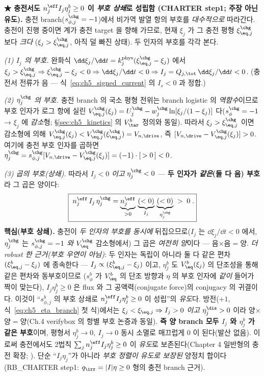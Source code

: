 \begin{verifybox}
\textbf{★ 충전서도 $n_j^{\eff}I_j\eta_j^b\ge0$ 이 \emph{부호 상쇄}로 성립함 (CHARTER step1; 주장 아닌 유도).}
충전 branch($s_{\phi,j}^\chg=-1$)에서 비가역 발열 항의 부호를 \emph{대수적으로} 따라간다. 충전이 진행 중이면
계가 충전 target 을 향해 가므로, 현재 $\xi_j$ 가 그 충전 평형 $\xi_{\eq,j}^\chg$ 보다 \emph{크다}
($\xi_j>\xi_{\eq,j}^\chg$, 아직 덜 빠진 상태). 두 인자의 부호를 각각 본다.

\emph{(1) $I_j$ 의 부호.} 완화식 $\dd\xi_j/\dd t=k_j^{\mathrm{phys}}(\xi_{\eq,j}^\chg-\xi_j)$ 에서
$\xi_j>\xi_{\eq,j}^\chg\Rightarrow\xi_{\eq,j}^\chg-\xi_j<0\Rightarrow\dd\xi_j/\dd t<0\Rightarrow I_j=Q_{j,\tot}
\,\dd\xi_j/\dd t<0$. (충전서 전류가 음 — 식~\eqref{eq:ch5_signed_current} 의 $I_s<0$ 과 정합.)

\emph{(2) $\eta_j^\chg$ 의 부호.} 충전 branch 의 국소 평형 전위는 branch logistic 의 \emph{역함수}이므로 부호 인자가
로그 항에 실린 $V_{\eq,j}^\chg(\xi_j)=U_j^\chg-w_j^\chg\ln[\xi_j/(1-\xi_j)]$ 다($s_{\phi}^\chg=-1$ → $\xi_j$ 에
\emph{감소}형; \S\ref{sec:ch5_kinetics} 의 $V_{\tar}^b$ 정의와 동일). 따라서 $\xi_j>\xi_{\eq,j}^\chg$ 이면 감소형에
의해 $V_{\eq,j}^\chg(\xi_j)<V_{\eq,j}^\chg(\xi_{\eq,j}^\chg)=V_{n,\drive}$, 즉 $[V_{n,\drive}-V_{\eq,j}^\chg(\xi_j)]>0$.
여기에 충전 부호 인자를 곱하면 $\eta_j^\chg=s_{\phi,j}^\chg[V_{n,\drive}-V_{\eq,j}^\chg(\xi_j)]=(-1)\cdot[\,>0\,]<0$.

\emph{(3) 곱의 부호(상쇄).} 따라서 $I_j<0$ \emph{이고} $\eta_j^\chg<0$ — \textbf{두 인자가 \emph{같은}(둘 다
음) 부호}라 그 곱은 양이다:
\begin{equation}
\boxed{\;n_j^{\eff}\,I_j\,\eta_j^\chg=\underbrace{n_j^{\eff}}_{>0}\,\underbrace{(<0)}_{I_j}\,\underbrace{(<0)}_{\eta_j^\chg}\;>\;0\;.}
\label{eq:ch5_qirr_charge}
\end{equation}
\textbf{핵심(부호 상쇄).} 충전이 \emph{두 인자의 부호를 동시에} 뒤집으므로($I_j$ 는 $\dd\xi_j/\dd t<0$ 에서,
$\eta_j^\chg$ 는 $s_{\phi,j}^\chg=-1$ \emph{와} $V_{\eq}^\chg$ 감소형에서) 그 곱은 \emph{여전히 양}이다 — 음$\times$음$=$양.
\emph{더 robust 한 근거(부호 우연이 아님)}: 두 인자는 독립이 아니라 둘 다 같은 편차 $(\xi_{\eq,j}^b-\xi_j)$ 에 종속한다
— $I_j\propto(\xi_{\eq,j}^b-\xi_j)$ 이고, $\eta_j^b$ 도 $V_{\eq}^b(\xi_j)$ 의 단조성을 통해 같은 편차와 동부호이므로
($s_\phi^b$ 가 $V_{\eq}^b$ 의 단조 방향과 $\eta$ 의 부호 인자에 \emph{같이} 들어가 짝이 맞는다), $I_j\eta_j^b\ge0$ 은
flux 와 그 공액력(conjugate force)의 conjugacy 의 귀결이다. 이것이
``$s_{\phi,j}^b$ 의 부호 상쇄로 $n_j^{\eff}I_j\eta_j^b\ge0$ 이 성립''의 \emph{유도}다. 방전($+1$,
식~\eqref{eq:ch5_eta_branch} 첫 식)에서는 $\xi_j<\xi_{\eq,j}\Rightarrow I_j>0$ \emph{이고} $\eta_j^\dis>0$
이라 양$\times$양$=$양(Ch.4 verifybox 의 항별 부호 논증과 동일). \textbf{즉 양 branch 모두 $I_j$ 와 $\eta_j^b$
가 같은 부호}이며, 평형서 $\eta_j^b\to0,\ I_j\to0$ 동시 소멸로 매끄럽게 0 이 된다(발산 없음). 이로써
충전에서도 2법칙 $\sum_j n_j^{\eff}I_j\eta_j^b\ge0$ 이 \emph{유도}로 보존된다(Chapter 4 일반형의 충전 확장;
). 단순 ``$I_j\eta_j$''가 아니라 \emph{부호 정렬이 유도로 보장된} 양정치 합이다(RB\_CHARTER step1:
$q_\irr=|I|\eta\ge0$ 형의 충전 branch 근거).
\end{verifybox}

